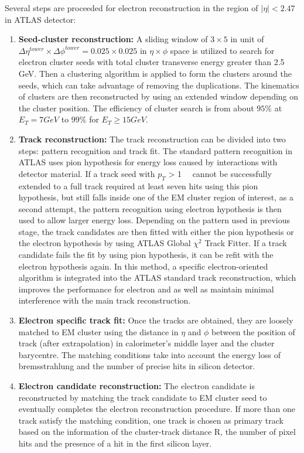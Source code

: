 Several steps are proceeded for electron reconstruction in the region of $|\eta| < 2.47$ in ATLAS detector:
\begin{enumerate}
	\item \textbf{Seed-cluster reconstruction:} A sliding window of $3 \times 5$ in unit of $\Delta\eta^{tower} \times \Delta\phi^{tower} = 0.025 \times 0.025$ in $\eta \times \phi$ space is utilized to search for electron cluster seeds with total cluster transverse energy greater than 2.5 GeV. Then a clustering algorithm\cite{Lampl:1099735} is applied to form the clusters around the seeds, which can take advantage of removing the duplications. The kinematics of clusters are then reconstructed by using an extended window depending on the cluster position. The efficiency of cluster search is from about $95\%$ at $E_{T} = 7 GeV$ to $99\%$ for $E_{T} \geq 15 GeV$.
	\item \textbf{Track reconstruction:} The track reconstruction can be divided into two steps: pattern recognition and track fit. The standard pattern recognition in ATLAS uses pion hypothesis for energy loss caused by interactions with detector material. If a track seed with $p_{T}$ > 1~\gev~ cannot be successfully extended to a full track required at least seven hits using this pion hypothesis, but still falls inside one of the EM cluster region of interest, as a second attempt, the pattern recognition using electron hypothesis is then used to allow larger energy loss.
Depending on the pattern used in previous stage, the track candidates are then fitted with either the pion hypothesis or the electron hypothesis by using ATLAS Global $\chi^{2}$ Track Fitter\cite{Cornelissen_2008}. If a track candidate fails the fit by using pion hypothesis, it can be refit with the electron hypothesis again. In this method, a specific electron-oriented algorithm is integrated into the ATLAS standard track reconstruction, which improves the performance for electron and as well as maintain minimal interference with the main track reconstruction. 
	\item \textbf{Electron specific track fit:} Once the tracks are obtained, they are loosely matched to EM cluster using the distance in $\eta$ and $\phi$ between the position of track (after extrapolation) in calorimeter's middle layer and the cluster barycentre. The matching conditions take into account the energy loss of bremsstrahlung and the number of precise hits in silicon detector.
	\item \textbf{Electron candidate reconstruction:} The electron candidate is reconstructed by matching the track candidate to EM cluster seed to eventually completes the electron reconstruction procedure. If more than one track satisfy the matching condition, one track is chosen as primary track based on the information of the cluster-track distance R, the number of pixel hits and the presence of a hit in the first silicon layer\cite{ATLAS-CONF-2014-032}.

\end{enumerate}
